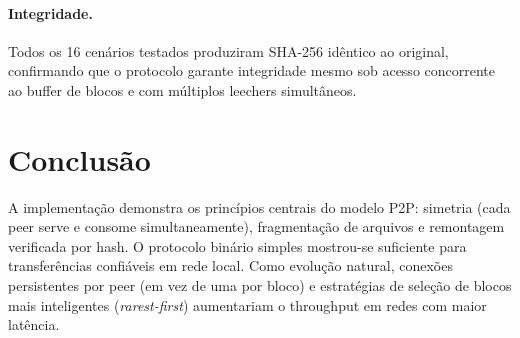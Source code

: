 \documentclass[12pt,a4paper]{article}
\begin{document}
\paragraph{Integridade.}
Todos os 16 cenários testados produziram SHA-256 idêntico ao original,
confirmando que o protocolo garante integridade mesmo sob acesso concorrente
ao buffer de blocos e com múltiplos leechers simultâneos.

\section{Conclusão}

A implementação demonstra os princípios centrais do modelo P2P: simetria
(cada peer serve e consome simultaneamente), fragmentação de arquivos e
remontagem verificada por hash. O protocolo binário simples mostrou-se
suficiente para transferências confiáveis em rede local. Como evolução
natural, conexões persistentes por peer (em vez de uma por bloco) e
estratégias de seleção de blocos mais inteligentes (\emph{rarest-first})
aumentariam o throughput em redes com maior latência.
\end{document}
